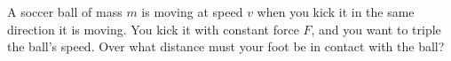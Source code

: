 A soccer ball of mass $m$ is moving at speed $v$ when you kick it in
the same direction it is moving. You kick it with constant force $F$,
and you want to triple the ball's speed. Over what distance must your
foot be in contact with the ball?\answercheck
